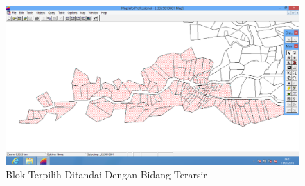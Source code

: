\begin{enumerate}[1.]
  \begin{figure}[H]
    \centering
    \includegraphics[width=1\textwidth]{./resources/073-hasil-pencarian-blok}
    \caption{Blok Terpilih Ditandai Dengan Bidang Terarsir}
  \end{figure}
\end{enumerate}